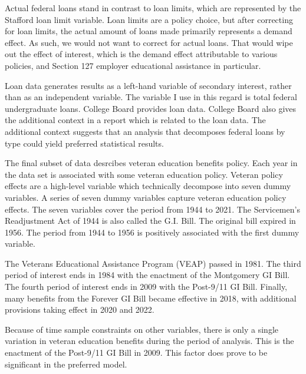 \documentclass[review]{elsarticle}
\begin{document}
Actual federal loans stand in contrast to loan limits, which are represented by the Stafford loan limit variable.
Loan limits are a policy choice, but after correcting for loan limits,
the actual amount of loans made primarily represents a demand effect.
As such, we would not want to correct for actual loans.
That would wipe out the effect of interest,
which is the demand effect attributable to various policies,
and Section 127 employer educational assistance in particular.

Loan data generates results as a left-hand variable of secondary interest, rather than as an independent variable.
The variable I use in this regard is total federal undergraduate loans.
College Board provides loan data.
College Board also gives the additional context in a report which is related to the loan data\cite{cb_excel_2019}.
The additional context suggests that an analysis that decomposes federal loans by type could yield preferred statistical results\cite{cb_trends_2019}.

The final subset of data desrcibes veteran education benefits policy.
Each year in the data set is associated with some veteran education policy.
Veteran policy effects are a high-level variable which technically decompose into seven dummy variables.
A series of seven dummy variables capture veteran education policy effects.
The seven variables cover the period from 1944 to 2021.
The Servicemen's Readjustment Act of 1944 is also called the G.I. Bill.
The original bill expired in 1956\cite{glass_2010}.
The period from 1944 to 1956 is positively associated with the first dummy variable.

The Veterans Educational Assistance Program (VEAP) passed in 1981\cite{veteransaffairs_2017}.
The third period of interest ends in 1984 with the enactment of the Montgomery GI Bill\cite{powers_2018}.
The fourth period of interest ends in 2009 with the Post-9/11 GI Bill.
Finally, many benefits from the Forever GI Bill became effective in 2018,
with additional provisions taking effect in 2020 and 2022\cite{veteransaffairs_2020}.

Because of time sample constraints on other variables,
there is only a single variation in veteran education benefits during the period of analysis.
This is the enactment of the Post-9/11 GI Bill in 2009.
This factor does prove to be significant in the preferred model.
\end{document}
